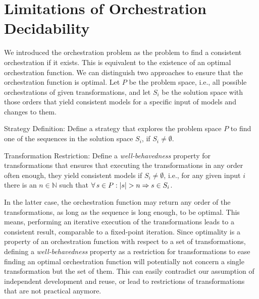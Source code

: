 \section{Limitations of Orchestration Decidability}
\label{chap:orchestration:decidability}

We introduced the orchestration problem as the problem to find a consistent orchestration if it exists.
This is equivalent to the existence of an optimal orchestration function.
We can distinguish two approaches to ensure that the orchestration function is optimal. %
Let $P$ be the problem space, i.e., all possible orchestrations of given transformations, and let $S_{i}$ be the solution space with those orders that yield consistent models for a specific input of models and changes to them.
\begin{properdescription}
    \item[Strategy Definition:] Define a strategy that explores the problem space $P$ to find one of the sequences in the solution space $S_{i}$, if $S_{i} \neq \emptyset$.
    \item[Transformation Restriction:] Define a \emph{well-behavedness} property for transformations that ensures that executing the transformations in any order often enough, they yield consistent models if $S_{i} \neq \emptyset$, i.e., for any given input $i$ there is an $n \in \mathbb{N}$ such that $\forall s \in P : \abs{s} > n \Rightarrow s \in S_{i}$.
\end{properdescription}


In the latter case, the orchestration function may return any order of the transformations, as long as the sequence is long enough, to be optimal.
This means, performing an iterative execution of the transformations leads to a consistent result, comparable to a fixed-point iteration.
Since optimality is a property of an orchestration function with respect to a set of transformations, defining a \emph{well-behavedness} property as a restriction for transformations to ease finding an optimal orchestration function will potentially not concern a single transformation but the set of them.
This can easily contradict our assumption of independent development and reuse, or lead to restrictions of transformations that are not practical anymore.

